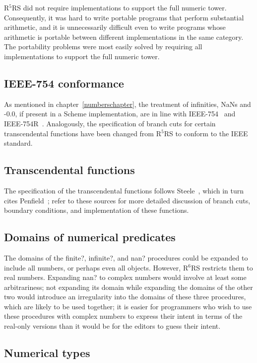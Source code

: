\documentclass[twoside,twocolumn]{algol60}
\newcommand{\rn}[1]{R$^{#1}$RS}
\begin{document}
\rn{5} did not require implementations to support the full numeric
tower.  Consequently, it was hard to write portable programs that
perform substantial arithmetic, and it is unnecessarily difficult even
to write programs whose arithmetic is portable between different
implementations in the same category.  The portability problems were
most easily solved by requiring all implementations to support the
full numeric tower.

\subsection{IEEE-754 conformance}

As mentioned in chapter~\ref{numberschapter}, the treatment of
infinities, NaNs and -0.0, if present in a Scheme implementation, are
in line with IEEE-754~\cite{IEEE} and IEEE-754R~\cite{IEEE754R}.
Analogously, the specification of branch cuts for certain
transcendental functions have been changed from \rn{5} to conform to
the IEEE standard.

\subsection{Transcendental functions}

The specification of the transcendental functions follows
Steele~\cite{CLtL}, which in turn cites Penfield~\cite{Penfield81};
refer to these sources for more detailed discussion of branch cuts,
boundary conditions, and implementation of these functions.

\subsection{Domains of numerical predicates}

The domains of the {\cf finite?}, {\cf infinite?}, and {\cf nan?}
procedures could be expanded to include all numbers, or perhaps even
all objects.  However, \rn{6} restricts them to real numbers.
Expanding {\cf nan?} to complex numbers would involve at least some
arbitrariness; not expanding its domain while expanding the domains of
the other two would introduce an irregularity into the domains of
these three procedures, which are likely to be used together; it is
easier for programmers who wish to use these procedures with complex
numbers to express their intent in terms of the real-only versions
than it would be for the editors to guess their intent.

\subsection{Numerical types}
\end{document}
